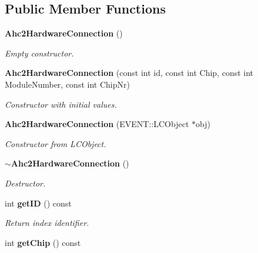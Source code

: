 \subsection*{Public Member Functions}
\begin{DoxyCompactItemize}
\item 
{\bf Ahc2\-Hardware\-Connection} ()\label{classCALICE_1_1Ahc2HardwareConnection_a0becd0f9301781011ab848337c3c7eab}

\begin{DoxyCompactList}\small\item\em Empty constructor. \end{DoxyCompactList}\item 
{\bf Ahc2\-Hardware\-Connection} (const int id, const int Chip, const int Module\-Number, const int Chip\-Nr)\label{classCALICE_1_1Ahc2HardwareConnection_ab19d0086bc61acb957d03a547c0ab589}

\begin{DoxyCompactList}\small\item\em Constructor with initial values. \end{DoxyCompactList}\item 
{\bf Ahc2\-Hardware\-Connection} (E\-V\-E\-N\-T\-::\-L\-C\-Object $\ast$obj)\label{classCALICE_1_1Ahc2HardwareConnection_a9c3e5db7893f4aacf68ec17cb9aeb421}

\begin{DoxyCompactList}\small\item\em Constructor from L\-C\-Object. \end{DoxyCompactList}\item 
{\bf $\sim$\-Ahc2\-Hardware\-Connection} ()\label{classCALICE_1_1Ahc2HardwareConnection_ab77e19f41adae47a8d88d10c3b171c16}

\begin{DoxyCompactList}\small\item\em Destructor. \end{DoxyCompactList}\item 
int {\bf get\-I\-D} () const \label{classCALICE_1_1Ahc2HardwareConnection_abe54d399d3d4e02c602deea3c224f8a5}

\begin{DoxyCompactList}\small\item\em Return index identifier. \end{DoxyCompactList}\item 
int {\bf get\-Chip} () const \label{classCALICE_1_1Ahc2HardwareConnection_ab7f74ef16dfe7b6a25e2c56230d0c6fc}


\end{DoxyCompactItemize}
